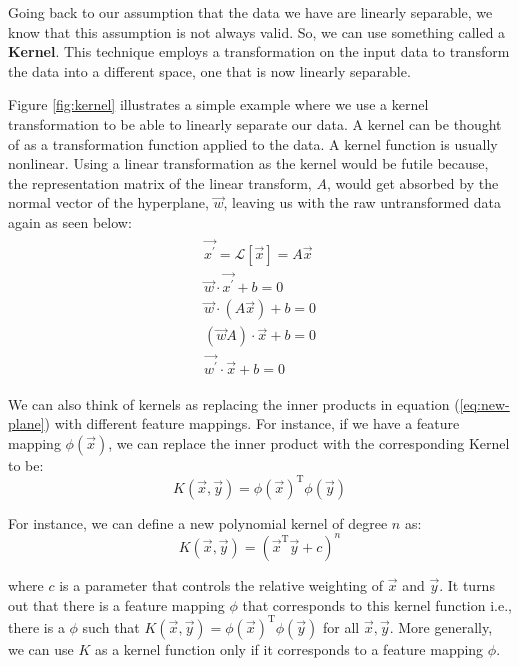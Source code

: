 Going back to our assumption that the data we have are linearly separable, we know that this assumption is not always valid. So, we can use something called a \textbf{Kernel}. This technique employs a transformation on the input data to transform the data into a different space, one that is now linearly separable.

Figure \ref{fig:kernel} illustrates a simple example where we use a kernel transformation to be able to linearly separate our data. A kernel can be thought of as a transformation function applied to the data. A kernel function is usually nonlinear. Using a linear transformation as the kernel would be futile because, the representation matrix of the linear transform, $A$, would get absorbed by the normal vector of the hyperplane, $\vec{w}$, leaving us with the raw untransformed data again as seen below:
\begin{gather}
\begin{aligned}
	\vec{x^{'}} = \mathcal{L}[\vec{x}] = A\vec{x} \nonumber\\
	\vec{w}\cdot\vec{x^{'}} + b = 0 \nonumber\\
	\vec{w}\cdot (A\vec{x}) + b = 0 \nonumber\\
	(\vec{w}A)\cdot\vec{x} + b = 0 \nonumber\\
	\vec{w^{'}}\cdot\vec{x} + b = 0
\end{aligned}
\end{gather}

We can also think of kernels as replacing the inner products in equation (\ref{eq:new-plane}) with different feature mappings. For instance, if we have a feature mapping $\phi(\vec{x})$, we can replace the inner product with the corresponding Kernel to be:
\begin{equation*}
K(\vec{x}, \vec{y}) = \phi(\vec{x})^{\text{T}}\phi(\vec{y})
\end{equation*}

For instance, we can define a new polynomial kernel of degree $n$ as:
\begin{equation*}
K(\vec{x}, \vec{y}) = (\vec{x}^{\text{T}}\vec{y} + c)^n
\end{equation*}

where $c$ is a parameter that controls the relative weighting of $\vec{x}$ and $\vec{y}$. It turns out that there is a feature mapping $\phi$ that corresponds to this kernel function i.e., there is a $\phi$ such that $K(\vec{x}, \vec{y}) = \phi(\vec{x})^{\text{T}}\phi(\vec{y})$ for all $\vec{x}, \vec{y}$\cite{svm-andrew-ng}. More generally, we can use $K$ as a kernel function only if it corresponds to a feature mapping $\phi$.

